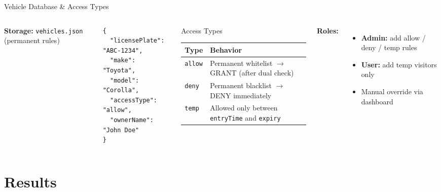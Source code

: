 \documentclass[aspectratio=169,11pt]{beamer}
\begin{document}
\begin{frame}[fragile]{Vehicle Database \& Access Types}
  \begin{columns}[T]
    \textbf{Storage:} \texttt{vehicles.json} (permanent rules)
    \begin{lstlisting}
{
  "licensePlate": "ABC-1234",
  "make": "Toyota",
  "model": "Corolla",
  "accessType": "allow",
  "ownerName": "John Doe"
}
    \end{lstlisting}
    \begin{block}{Access Types}
      \begin{tabular}{@{}p{1.2cm}p{4.5cm}@{}}
        \toprule
        \textbf{Type} & \textbf{Behavior} \\
        \midrule
        \texttt{allow} & Permanent whitelist $\rightarrow$ GRANT (after dual check) \\
        \texttt{deny}  & Permanent blacklist $\rightarrow$ DENY immediately \\
        \texttt{temp}  & Allowed only between \texttt{entryTime} and \texttt{expiry} \\
        \bottomrule
      \end{tabular}
    \end{block}
    \textbf{Roles:}
    \begin{itemize}
      \item \textbf{Admin:} add allow / deny / temp rules
      \item \textbf{User:} add temp visitors only
      \item Manual override via dashboard
    \end{itemize}
  \end{columns}
\end{frame}

\section{Results}
\end{document}
